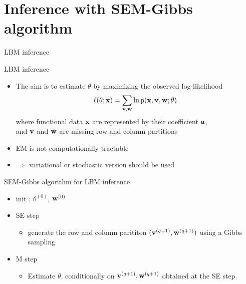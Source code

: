 \documentclass[10pt]{beamer}
\newcommand{\pdf}{\mbox{p}}
\newcommand{\ba}{\bold{a}}
\newcommand{\bx}{\bold{x}}
\newcommand{\bw}{\bold{w}}
\newcommand{\bv}{\bold{v}}
\begin{document}
\section{Inference with SEM-Gibbs algorithm}

\begin{frame}{LBM inference}
\begin{block}{LBM inference}
\begin{itemize}
\item The aim is to estimate $\theta$ by maximizing the observed log-likelihood 
\begin{eqnarray*}
\label{eq:loglik}
\ell(\theta;{\bx})=\sum_{\bv,\bw} \ln \pdf(\bx,\bv,\bw;\theta).
\end{eqnarray*}
where functional data $\bx$ are represented by their coefficient $\ba$,\\ and $\bv$ and $\bw$ are missing row and column partitions
\item EM is not computationally tractable
\item $\Rightarrow$ variational or stochastic version should be used
\end{itemize}
\end{block}
\end{frame}

\begin{frame}{SEM-Gibbs algorithm for LBM inference}
\begin{itemize}
\item init : $\theta^{(0)}$, $\bw^{(0)}$
\item SE step
\begin{itemize}
\item generate the row and column parititon  $(\bv^{(q+1)}, \bw^{(q+1)})$ using a Gibbs sampling
\end{itemize}
\item M step
\begin{itemize}
\item Estimate $\theta$, conditionally on $\bv^{(q+1)}, \bw^{(q+1)}$ obtained at the SE step.
\end{itemize}
\end{itemize}
\end{frame}
\end{document}
